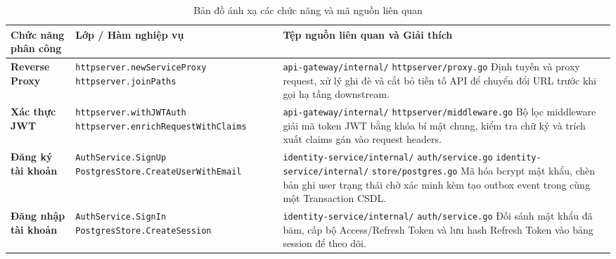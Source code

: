 \documentclass[14pt,a4paper,oneside]{extreport}
\begin{document}
\begin{table}[H]
\centering
\caption{Bản đồ ánh xạ các chức năng và mã nguồn liên quan}
\label{tab:code-map-detail}
\renewcommand{\arraystretch}{1.2}
\scriptsize
\begin{tabularx}{\textwidth}{|>{\raggedright\arraybackslash}p{2.5cm}|>{\hsize=0.8\hsize\raggedright\arraybackslash}X|>{\hsize=1.2\hsize\raggedright\arraybackslash}X|}
\hline
\textbf{Chức năng phân công} & \textbf{Lớp / Hàm nghiệp vụ} & \textbf{Tệp nguồn liên quan và Giải thích} \\
\hline
\textbf{Reverse Proxy} &
  \texttt{httpserver.\allowbreak newServiceProxy} \newline
  \texttt{httpserver.\allowbreak joinPaths} &
  \texttt{api-gateway/internal/} \newline \texttt{httpserver/proxy.go} \newline
  Định tuyến và proxy request, xử lý ghi đè và cắt bỏ tiền tố API để chuyển đổi URL trước khi gọi hạ tầng downstream. \\
\hline
\textbf{Xác thực JWT} &
  \texttt{httpserver.\allowbreak withJWTAuth} \newline
  \texttt{httpserver.\allowbreak enrichRequestWithClaims} &
  \texttt{api-gateway/internal/} \newline \texttt{httpserver/middleware.go} \newline
  Bộ lọc middleware giải mã token JWT bằng khóa bí mật chung, kiểm tra chữ ký và trích xuất claims gán vào request headers. \\
\hline
\textbf{Đăng ký tài khoản} &
  \texttt{AuthService.\allowbreak SignUp} \newline
  \texttt{PostgresStore.\allowbreak CreateUserWithEmail} &
  \texttt{identity-service/internal/} \newline \texttt{auth/service.go} \newline
  \texttt{identity-service/internal/} \newline \texttt{store/postgres.go} \newline
  Mã hóa bcrypt mật khẩu, chèn bản ghi user trạng thái chờ xác minh kèm tạo outbox event trong cùng một Transaction CSDL. \\
\hline
\textbf{Đăng nhập tài khoản} &
  \texttt{AuthService.\allowbreak SignIn} \newline
  \texttt{PostgresStore.\allowbreak CreateSession} &
  \texttt{identity-service/internal/} \newline \texttt{auth/service.go} \newline
  Đối sánh mật khẩu đã băm, cấp bộ Access/Refresh Token và lưu hash Refresh Token vào bảng session để theo dõi. \\

\end{tabularx}
\end{table}
\end{document}
